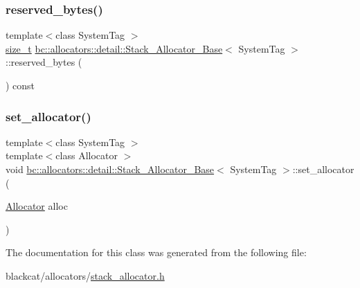 \subsubsection{\texorpdfstring{reserved\+\_\+bytes()}{reserved\_bytes()}}
{\footnotesize\ttfamily template$<$class System\+Tag $>$ \\
\hyperlink{namespacebc_aaf8e3fbf99b04b1b57c4f80c6f55d3c5}{size\+\_\+t} \hyperlink{classbc_1_1allocators_1_1detail_1_1Stack__Allocator__Base}{bc\+::allocators\+::detail\+::\+Stack\+\_\+\+Allocator\+\_\+\+Base}$<$ System\+Tag $>$\+::reserved\+\_\+bytes (\begin{DoxyParamCaption}{ }\end{DoxyParamCaption}) const\hspace{0.3cm}{\ttfamily [inline]}}

\mbox{\label{classbc_1_1allocators_1_1detail_1_1Stack__Allocator__Base_ace8c1d19b6675c7b02e4358c5d3a5964}} 
\subsubsection{\texorpdfstring{set\+\_\+allocator()}{set\_allocator()}}
{\footnotesize\ttfamily template$<$class System\+Tag $>$ \\
template$<$class Allocator $>$ \\
void \hyperlink{classbc_1_1allocators_1_1detail_1_1Stack__Allocator__Base}{bc\+::allocators\+::detail\+::\+Stack\+\_\+\+Allocator\+\_\+\+Base}$<$ System\+Tag $>$\+::set\+\_\+allocator (\begin{DoxyParamCaption}\item[{\hyperlink{classbc_1_1allocators_1_1Allocator}{Allocator}}]{alloc }\end{DoxyParamCaption})\hspace{0.3cm}{\ttfamily [inline]}}



The documentation for this class was generated from the following file\+:\begin{DoxyCompactItemize}
\item 
blackcat/allocators/\hyperlink{stack__allocator_8h}{stack\+\_\+allocator.\+h}\end{DoxyCompactItemize}
